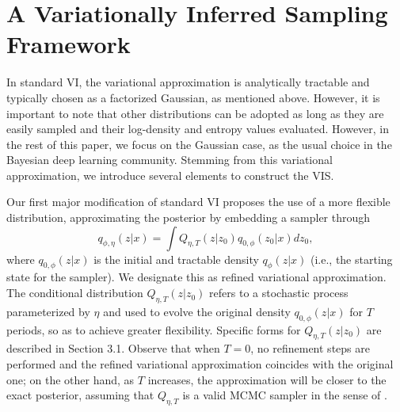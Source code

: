 




\section{A Variationally Inferred Sampling Framework}\label{sec:main}


In standard VI, the variational approximation %
is analytically tractable and typically chosen as a factorized Gaussian, as mentioned above. {However, it is important to note that 
other distributions can be adopted as long as they 
are easily sampled and their log-density and entropy values
evaluated. However, in the rest of this paper, we focus on the Gaussian case, as the usual choice in the Bayesian deep learning community.}
Stemming from {this variational approximation}, we introduce several elements to construct the VIS.

Our first major modification of standard VI proposes the use of a more
flexible distribution, approximating the posterior by embedding a sampler through
\begin{equation}\label{eq:q}
q_{\phi,\eta}(z|x) = \int Q_{\eta, T}(z|z_0)q_{0,\phi}(z_0|x)dz_0,
\end{equation}
where $q_{0,\phi} (z | x)$ is the initial and tractable density
$q_{\phi} (z | x)$
(i.e., the starting state for the sampler). %
We designate this as refined variational approximation.
The conditional distribution $Q_{\eta, T}(z|z_0)$ refers
to a stochastic process parameterized by $\eta$ and 
used to evolve the original density $q_{0,\phi}(z|x)$
for $T$ periods, so as to achieve greater flexibility. Specific 
forms for $Q_{\eta, T}(z|z_0)$
are described in Section 3.1.
{Observe that when $T=0$, no refinement steps are performed and the refined variational approximation coincides with the original one; on the other hand, as 
 $T$ increases, the approximation will be closer to the exact posterior, assuming that $Q_{\eta, T}$ is a valid MCMC sampler
 in the sense of \cite{ma2015complete}}.

